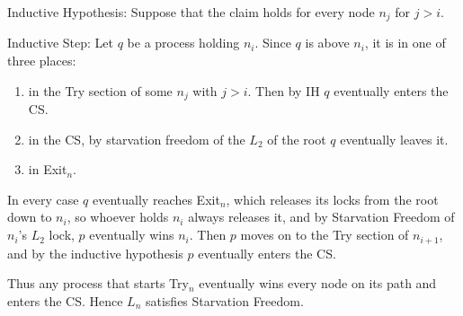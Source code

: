 \documentclass[12pt]{article}
\begin{document}
\begin{solution}
    Inductive Hypothesis: Suppose that the claim holds for every node $n_j$ for $j>i$. 

    Inductive Step: Let $q$ be a process holding $n_i$. Since $q$ is above $n_i$, it is in one of three places: 
    \begin{enumerate}
        \item in the Try section of some $n_j$ with $j > i$. Then by IH $q$ eventually enters the CS. 
        \item in the CS, by starvation freedom of the $L_2$ of the root $q$ eventually leaves it. 
        \item in Exit$_n$. 
    \end{enumerate}

    In every case $q$ eventually reaches Exit$_n$, which releases its locks from the root down to $n_i$, so whoever holds $n_i$ always releases it, and by Starvation Freedom of $n_i$'s $L_2$ lock, $p$ eventually wins $n_i$. Then $p$ moves on to the Try section of $n_{i+1}$, and by the inductive hypothesis $p$ eventually enters the CS.

    Thus any process that starts Try$_n$ eventually wins every node on its path and enters the CS. Hence $L_n$ satisfies Starvation Freedom.
    

    
\end{solution}
\end{document}
